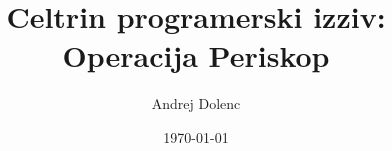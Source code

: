 \documentclass{beamer}
\title{Celtrin programerski izziv: Operacija Periskop}
\author{Andrej Dolenc}
\institute{\small{FMF IŠRM II}}
\date{\small{\today}}
\renewcommand*\insertnavigation[1]{\vspace{16pt}}
\begin{document}
{
  \renewcommand*\insertnavigation[1]{\vspace{22pt}}
  \begin{frame}
    \vspace{60pt}
    \titlepage
  \end{frame}
}



\end{document}
